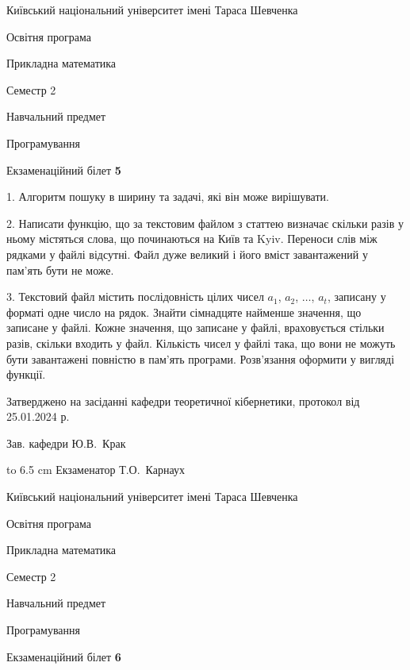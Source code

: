 \documentclass[12pt, ukrainian]{article}
\begin{document}
\vspace{0.9cm}
{{\begin {scriptsize}\par
{ \center  Київський національний університет імені Тараса Шевченка \par}
{\parbox {5 cm}{Освітня програма \hfill}{\parbox {7 cm}{Прикладна математика\hfill}}\parbox {6 cm}{\hfill Семестр 2}}\par
{\parbox {5 cm} {Навчальний предмет \hfill}\parbox {7 cm}{Програмування \hfill}\parbox {6cm}{\hfill}\par}\vspace{-15pt} \end{scriptsize}}{\center Екзаменаційний білет \No \textbf { 5 }\par}}
{%
1. Алгоритм пошуку в ширину та задачі, які він може вирішувати.%
\par
2. Написати функцію, що за текстовим файлом з статтею визначає скільки разів у ньому містяться слова, що починаються на Київ та Kyiv.  Переноси слів між рядками у файлі відсутні. Файл дуже великий і його вміст завантажений у пам'ять бути не може.

\par
3. Текстовий файл містить послідовність цілих чисел $a_1$, $a_2$, $\ldots$, $a_t$, записану у форматі одне число на рядок. Знайти сімнадцяте найменше значення, що записане у файлі. Кожне значення, що записане у файлі, враховується стільки разів, скільки входить у файл. Кількість чисел у файлі така, що вони не можуть бути завантажені повністю в пам'ять програми. Розв'язання оформити у вигляді функції.

}
{\smallskip\smallskip \begin {scriptsize} Затверджено на засіданні кафедри теоретичної кібернетики, протокол   від   25.01.2024 р.\par\smallskip\smallskip\smallskip\smallskip
{\parbox {6.5 cm} {Зав. кафедри \dotfill Ю.В.~Крак}}\hspace {0.7cm} {\hbox to 6.5 cm { Екзаменатор \dotfill Т.О.~Карнаух}} \end{scriptsize}}
\vspace{0.9cm}
{{\begin {scriptsize}\par
{ \center  Київський національний університет імені Тараса Шевченка \par}
{\parbox {5 cm}{Освітня програма \hfill}{\parbox {7 cm}{Прикладна математика\hfill}}\parbox {6 cm}{\hfill Семестр 2}}\par
{\parbox {5 cm} {Навчальний предмет \hfill}\parbox {7 cm}{Програмування \hfill}\parbox {6cm}{\hfill}\par}\vspace{-15pt} \end{scriptsize}}{\center Екзаменаційний білет \No \textbf { 6 }\par}}
\end{document}

